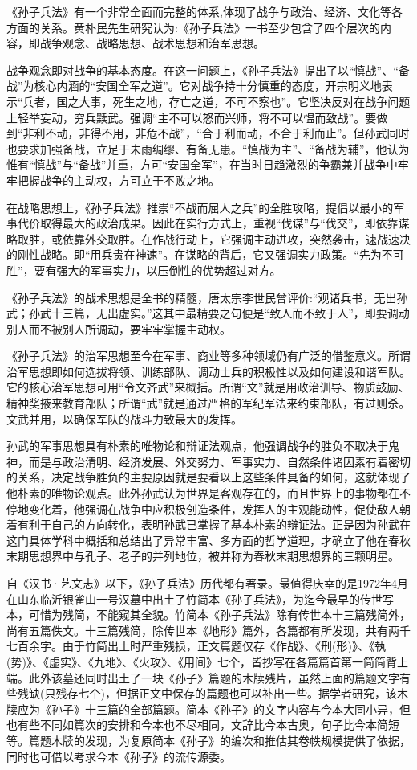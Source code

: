 \documentclass[12pt,UTF8]{ctexbook}
\begin{document}
《孙子兵法》有一个非常全面而完整的体系,体现了战争与政治、经济、文化等各方面的关系。黄朴民先生研究认为:《孙子兵法》一书至少包含了四个层次的内容，即战争观念、战略思想、战术思想和治军思想。

战争观念即对战争的基本态度。在这一问题上，《孙子兵法》提出了以“慎战”、“备战”为核心内涵的“安国全军之道”。它对战争持十分慎重的态度，开宗明义地表示“兵者，国之大事，死生之地，存亡之道，不可不察也”。它坚决反对在战争问题上轻举妄动，穷兵黩武。强调“主不可以怒而兴师，将不可以愠而致战”。要做到“非利不动，非得不用，非危不战”，“合于利而动，不合于利而止”。但孙武同时也要求加强备战，立足于未雨绸缪、有备无患。“慎战为主”、“备战为辅”，他认为惟有“慎战”与“备战”并重，方可“安国全军”，在当时日趋激烈的争霸兼并战争中牢牢把握战争的主动权，方可立于不败之地。

在战略思想上，《孙子兵法》推崇“不战而屈人之兵”的全胜攻略，提倡以最小的军事代价取得最大的政治成果。因此在实行方式上，重视“伐谋”与“伐交”，即依靠谋略取胜，或依靠外交取胜。在作战行动上，它强调主动进攻，突然袭击，速战速决的刚性战略。即“用兵贵在神速”。在谋略的背后，它又强调实力政策。“先为不可胜”，要有强大的军事实力，以压倒性的优势超过对方。

《孙子兵法》的战术思想是全书的精髓，唐太宗李世民曾评价:“观诸兵书，无出孙武；孙武十三篇，无出虚实。”这其中最精要之句便是“致人而不致于人”，即要调动别人而不被别人所调动，要牢牢掌握主动权。

《孙子兵法》的治军思想至今在军事、商业等多种领域仍有广泛的借鉴意义。所谓治军思想即如何选拔将领、训练部队、调动士兵的积极性以及如何建设和谐军队。它的核心治军思想可用“令文齐武”来概括。所谓“文”就是用政治训导、物质鼓励、精神奖掖来教育部队；所谓“武”就是通过严格的军纪军法来约束部队，有过则杀。文武并用，以确保军队的战斗力致最大的发挥。

孙武的军事思想具有朴素的唯物论和辩证法观点，他强调战争的胜负不取决于鬼神，而是与政治清明、经济发展、外交努力、军事实力、自然条件诸因素有着密切的关系，决定战争胜负的主要原因就是要看以上这些条件具备的如何，这就体现了他朴素的唯物论观点。此外孙武认为世界是客观存在的，而且世界上的事物都在不停地变化着，他强调在战争中应积极创造条件，发挥人的主观能动性，促使敌人朝着有利于自己的方向转化，表明孙武已掌握了基本朴素的辩证法。正是因为孙武在这门具体学科中概括和总结出了异常丰富、多方面的哲学道理，才确立了他在春秋末期思想界中与孔子、老子的并列地位，被并称为春秋末期思想界的三颗明星。

自《汉书·艺文志》以下，《孙子兵法》历代都有著录。最值得庆幸的是1972年4月在山东临沂银雀山一号汉墓中出土了竹简本《孙子兵法》，为迄今最早的传世写本，可惜为残简，不能窥其全貌。竹简本《孙子兵法》除有传世本十三篇残简外，尚有五篇佚文。十三篇残简，除传世本《地形》篇外，各篇都有所发现，共有两千七百余字。由于竹简出土时严重残损，正文篇题仅存《作战》、《刑(形)》、《執(势)》、《虚实》、《九地》、《火攻》、《用间》七个，皆抄写在各篇篇首第一简简背上端。此外该墓还同时出土了一块《孙子》篇题的木牍残片，虽然上面的篇题文字有些残缺(只残存七个)，但据正文中保存的篇题也可以补出一些。据学者研究，该木牍应为《孙子》十三篇的全部篇题。简本《孙子》的文字内容与今本大同小异，但也有些不同如篇次的安排和今本也不尽相同，文辞比今本古奥，句子比今本简短等。篇题木牍的发现，为复原简本《孙子》的编次和推估其卷帙规模提供了依据，同时也可借以考求今本《孙子》的流传源委。
\end{document}
